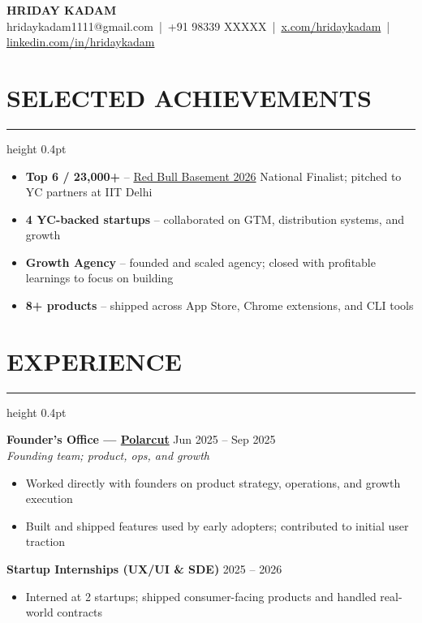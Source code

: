 \documentclass[11pt]{article}
\newcommand{\sectionheader}[1]{%
    \section*{#1}
    \vspace{-4pt}
    \hrule height 0.4pt
    \vspace{6pt}
}
\begin{document}
\pagestyle{empty}

\begin{center}
    {\LARGE \bfseries HRIDAY KADAM} \\
    \vspace{3pt}
    {\small
    hridaykadam1111@gmail.com \,|\, +91 98339 XXXXX \,|\,
    \href{https://x.com/hridaykadam}{x.com/hridaykadam} \,|\,
    \href{https://linkedin.com/in/hridaykadam}{linkedin.com/in/hridaykadam}
    }
\end{center}
\vspace{8pt}

\sectionheader{SELECTED ACHIEVEMENTS}

\begin{itemize}
    \item \textbf{Top 6 / 23,000+} -- \href{https://basement.redbull.com}{Red Bull Basement 2026} National Finalist; pitched to YC partners at IIT Delhi
    \item \textbf{4 YC-backed startups} -- collaborated on GTM, distribution systems, and growth
    \item \textbf{Growth Agency} -- founded and scaled agency; closed with profitable learnings to focus on building
    \item \textbf{8+ products} -- shipped across App Store, Chrome extensions, and CLI tools
\end{itemize}
\vspace{8pt}

\sectionheader{EXPERIENCE}

\noindent\textbf{Founder's Office --- \href{https://polarcut.io}{Polarcut}} \tabto{8cm} Jun 2025 -- Sep 2025 \\
\textit{Founding team; product, ops, and growth} \newline
\begin{itemize}
    \item Worked directly with founders on product strategy, operations, and growth execution
    \item Built and shipped features used by early adopters; contributed to initial user traction
\end{itemize}
\vspace{4pt}

\noindent\textbf{Startup Internships (UX/UI \& SDE)} \tabto{8cm} 2025 -- 2026 \\
\begin{itemize}
    \item Interned at 2 startups; shipped consumer-facing products and handled real-world contracts
\end{itemize}
\vspace{4pt}
\end{document}
